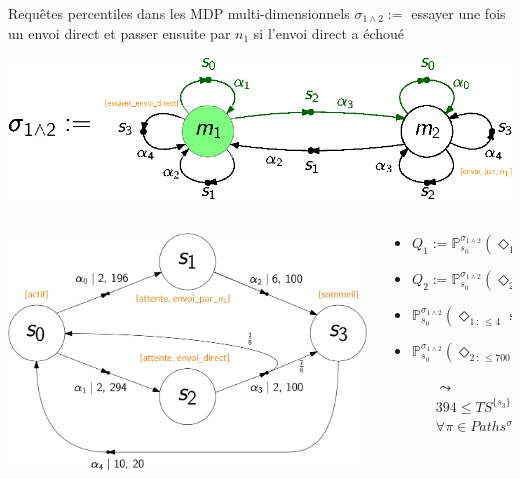 \documentclass[compress]{beamer}
\theoremstyle{theorem}%
\begin{document}
\begin{frame}{Requêtes percentiles dans les MDP multi-dimensionnels}
  \small
      $\sigma_{1 \wedge 2} := $ essayer une fois un envoi direct et passer ensuite par $n_1$ si l'envoi direct a échoué
      \begin{center}
        \includegraphics[width=0.7\linewidth]{resources/strategy}
      \end{center}
  \begin{center}
    \begin{columns}
      \begin{column}{0.4\linewidth}
        \includegraphics[width=\linewidth]{resources/mdmdp2}
      \end{column}
      \begin{column}{0.6\linewidth}{ \footnotesize
        \begin{itemize}
          \item $Q_1 := \mathbb{P}^{\sigma_{1 \wedge 2}}_{s_0}(\Diamond_{1\, :\, \leq 4} \text{ sommeil}) \geq 0.8$
          \item $Q_2 := \mathbb{P}^{\sigma_{1 \wedge 2}}_{s_0}(\Diamond_{2\, :\, \leq 700} \text{ sommeil}) \geq 0.9$
          \item $\mathbb{P}^{\sigma_{1 \wedge 2}}_{s_0}(\Diamond_{1\, :\, \leq 4} \text{ sommeil}) = 0.875 \models Q_1$
          \item $\mathbb{P}^{\sigma_{1 \wedge 2}}_{s_0}(\Diamond_{2\, :\, \leq 700} \text{ sommeil}) = 1 \models Q_2 $
          \begin{itemize}
            \scriptsize
            \item[$\leadsto$] $394 \leq TS^{\{s_3\}}(\pi) \leq 690$ $\forall \pi \in Paths^{\sigma_{1 \wedge 2}}(s_0)$
          \end{itemize}
        \end{itemize}
        }
      \end{column}
      \end{columns}
      \end{center}
\end{frame}
\end{document}

